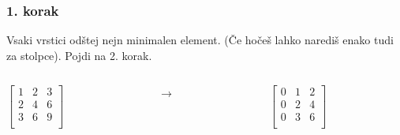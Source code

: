 \documentclass{beamer}
\begin{document}
\begin{frame}
    \frametitle{1. korak}
    \begin{block}{}
        Vsaki vrstici odštej nejn minimalen element. 
        (Če hočeš lahko narediš enako tudi za stolpce). Pojdi na 2. korak.
    \end{block}
    \hfill
    \begin{columns}[t]
        \begin{column}{0.25\linewidth}
         $\begin{bmatrix}
              1 & 2 & 3\\
             2 & 4 & 6\\
             3 & 6 & 9\\	
         \end{bmatrix}$
        \end{column}
        \begin{column}{0.005\linewidth}
         \centering
         $ \rightarrow $
        \end{column}
        \hfill
        \begin{column}{0.25\linewidth}
            \centering
            $\begin{bmatrix}
                0 & 1 & 2\\
                0 & 2 & 4\\
                0 & 3 & 6\\	
            \end{bmatrix}$
        \end{column}
    \end{columns}
\end{frame}
\end{document}
